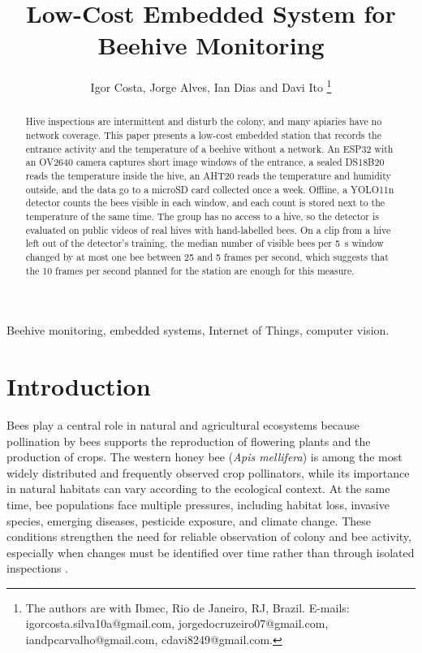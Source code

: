 \documentclass[english,hidelinks]{sbrt}
\begin{document}
\title{Low-Cost Embedded System for Beehive Monitoring}

\author{Igor Costa, Jorge Alves, Ian Dias and Davi Ito
  \thanks{The authors are with Ibmec, Rio de Janeiro, RJ, Brazil.
  E-mails: igorcosta.silva10a@gmail.com,
  jorgedocruzeiro07@gmail.com,
  iandpcarvalho@gmail.com,
  cdavi8249@gmail.com.}%
  }

\maketitle


\begin{abstract}
Hive inspections are intermittent and disturb the colony, and many apiaries have no network coverage. This paper presents a low-cost embedded station that records the entrance activity and the temperature of a beehive without a network. An ESP32 with an OV2640 camera captures short image windows of the entrance, a sealed DS18B20 reads the temperature inside the hive, an AHT20 reads the temperature and humidity outside, and the data go to a microSD card collected once a week. Offline, a YOLO11n detector counts the bees visible in each window, and each count is stored next to the temperature of the same time. The group has no access to a hive, so the detector is evaluated on public videos of real hives with hand-labelled bees. On a clip from a hive left out of the detector's training, the median number of visible bees per 5~s window changed by at most one bee between 25 and 5 frames per second, which suggests that the 10 frames per second planned for the station are enough for this measure.
\end{abstract}
\begin{keywords}
Beehive monitoring, embedded systems, Internet of Things, computer vision.
\end{keywords}

\section{Introduction}

Bees play a central role in natural and agricultural ecosystems because pollination by bees supports the reproduction of flowering plants and the production of crops. The western honey bee (\textit{Apis mellifera}) is among the most widely distributed and frequently observed crop pollinators, while its importance in natural habitats can vary according to the ecological context. At the same time, bee populations face multiple pressures, including habitat loss, invasive species, emerging diseases, pesticide exposure, and climate change. These conditions strengthen the need for reliable observation of colony and bee activity, especially when changes must be identified over time rather than through isolated inspections \cite{hung2018pollinators,brown2009conservation}.
\end{document}
